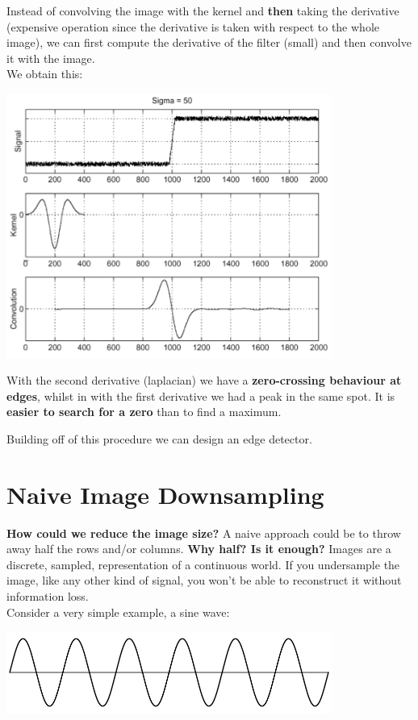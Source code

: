 \documentclass{article}
\begin{document}
Instead of convolving the image with the kernel and \textbf{then} taking the derivative (expensive operation since the derivative is taken with respect to the whole image), we can first compute the derivative of the filter (small) and then convolve it with the image. \\

We obtain this:
\begin{center}
\includegraphics[width=0.8\textwidth]{images/laplacian_derivative.png}
\end{center}

With the second derivative (laplacian) we have a \textbf{zero-crossing behaviour at edges}, whilst in with the first derivative we had a peak in the same spot. It is \textbf{easier to search for a zero} than to find a maximum.

Building off of this procedure we can design an edge detector.

\newpage

\section*{Naive Image Downsampling}

\textbf{How could we reduce the image size?} A naive approach could be to throw away half the rows and/or columns. \textbf{Why half? Is it enough?} Images are a discrete, sampled, representation of a continuous world. If you undersample the image, like any other kind of signal, you won't be able to reconstruct it without information loss. \\

Consider a very simple example, a sine wave:

\begin{center}
\includegraphics[width=0.8\textwidth]{images/signal_2.png}
\end{center}
\end{document}
